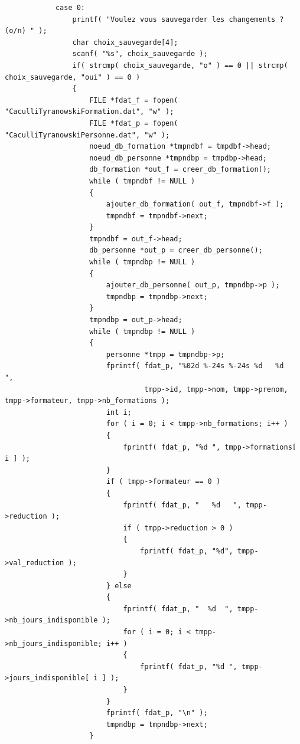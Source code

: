 \documentclass[11pt]{article}
\begin{document}
\begin{lstlisting}
            case 0:
                printf( "Voulez vous sauvegarder les changements ? (o/n) " );
                char choix_sauvegarde[4];
                scanf( "%s", choix_sauvegarde );
                if( strcmp( choix_sauvegarde, "o" ) == 0 || strcmp( choix_sauvegarde, "oui" ) == 0 )
                {
                    FILE *fdat_f = fopen( "CaculliTyranowskiFormation.dat", "w" );
                    FILE *fdat_p = fopen( "CaculliTyranowskiPersonne.dat", "w" );
                    noeud_db_formation *tmpndbf = tmpdbf->head;
                    noeud_db_personne *tmpndbp = tmpdbp->head;
                    db_formation *out_f = creer_db_formation();
                    while ( tmpndbf != NULL )
                    {
                        ajouter_db_formation( out_f, tmpndbf->f );
                        tmpndbf = tmpndbf->next;
                    }
                    tmpndbf = out_f->head;
                    db_personne *out_p = creer_db_personne();
                    while ( tmpndbp != NULL )
                    {
                        ajouter_db_personne( out_p, tmpndbp->p );
                        tmpndbp = tmpndbp->next;
                    }
                    tmpndbp = out_p->head;
                    while ( tmpndbp != NULL )
                    {
                        personne *tmpp = tmpndbp->p;
                        fprintf( fdat_p, "%02d %-24s %-24s %d   %d   ",
                                 tmpp->id, tmpp->nom, tmpp->prenom, tmpp->formateur, tmpp->nb_formations );
                        int i;
                        for ( i = 0; i < tmpp->nb_formations; i++ )
                        {
                            fprintf( fdat_p, "%d ", tmpp->formations[ i ] );
                        }
                        if ( tmpp->formateur == 0 )
                        {
                            fprintf( fdat_p, "   %d   ", tmpp->reduction );
                            if ( tmpp->reduction > 0 )
                            {
                                fprintf( fdat_p, "%d", tmpp->val_reduction );
                            }
                        } else
                        {
                            fprintf( fdat_p, "  %d  ", tmpp->nb_jours_indisponible );
                            for ( i = 0; i < tmpp->nb_jours_indisponible; i++ )
                            {
                                fprintf( fdat_p, "%d ", tmpp->jours_indisponible[ i ] );
                            }
                        }
                        fprintf( fdat_p, "\n" );
                        tmpndbp = tmpndbp->next;
                    }

\end{lstlisting}
\end{document}
